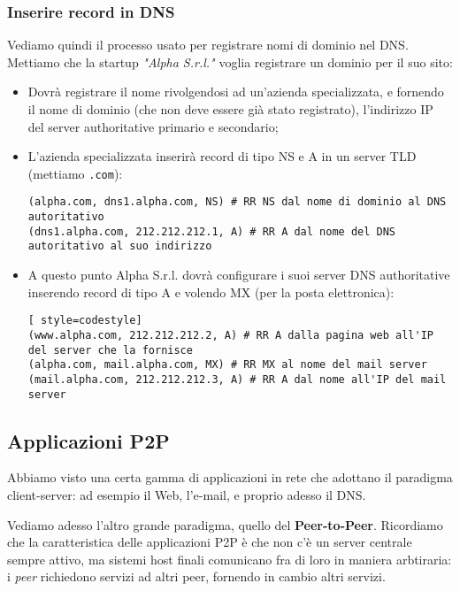 \documentclass[a4paper,11pt]{article}
\begin{document}
\subsubsection{Inserire record in DNS}
Vediamo quindi il processo usato per registrare nomi di dominio nel DNS.
Mettiamo che la startup \textit{"Alpha S.r.l."} voglia registrare un dominio per il suo sito:
\begin{itemize}
	\item Dovrà registrare il nome rivolgendosi ad un'azienda specializzata, e fornendo il nome di dominio (che non deve essere già stato registrato), l'indirizzo IP del server authoritative primario e secondario;

	\item L'azienda specializzata inserirà record di tipo NS e A in un server TLD (mettiamo \lstinline|.com|):
\begin{lstlisting}[style=codestyle]	
(alpha.com, dns1.alpha.com, NS) # RR NS dal nome di dominio al DNS autoritativo
(dns1.alpha.com, 212.212.212.1, A) # RR A dal nome del DNS autoritativo al suo indirizzo
\end{lstlisting}

	\item A questo punto Alpha S.r.l. dovrà configurare i suoi server DNS authoritative inserendo record di tipo A e volendo MX (per la posta elettronica):
\begin{lstlisting}[ style=codestyle]	
(www.alpha.com, 212.212.212.2, A) # RR A dalla pagina web all'IP del server che la fornisce
(alpha.com, mail.alpha.com, MX) # RR MX al nome del mail server
(mail.alpha.com, 212.212.212.3, A) # RR A dal nome all'IP del mail server 
\end{lstlisting}
\end{itemize}

\subsection{Applicazioni P2P}
Abbiamo visto una certa gamma di applicazioni in rete che adottano il paradigma client-server: ad esempio il Web, l'e-mail, e proprio adesso il DNS.

Vediamo adesso l'altro grande paradigma, quello del \textbf{Peer-to-Peer}.
Ricordiamo che la caratteristica delle applicazioni P2P è che non c'è un server centrale sempre attivo, ma sistemi host finali comunicano fra di loro in maniera arbtiraria: i \textit{peer} richiedono servizi ad altri peer, fornendo in cambio altri servizi.
\end{document}

